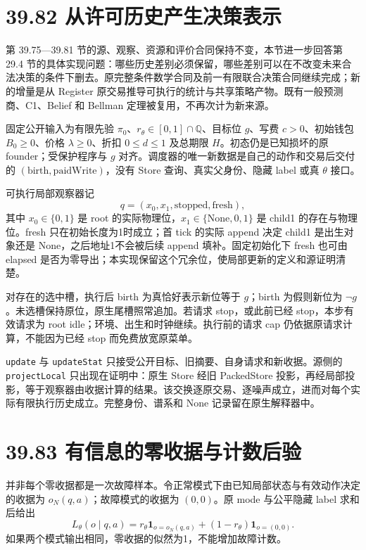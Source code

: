 \documentclass[
  11pt,
  oneside]{book}
\begin{document}
\section{39.82 从许可历史产生决策表示}\label{ux4eceux8bb8ux53efux5386ux53f2ux4ea7ux751fux51b3ux7b56ux8868ux793a}

第 39.75---39.81 节的源、观察、资源和评价合同保持不变，本节进一步回答第 29.4 节的具体实现问题：哪些历史差别必须保留，哪些差别可以在不改变未来合法决策的条件下删去。原完整条件数学合同及前一有限联合决策合同继续完成；新的增量是从 Register 原交易推导可执行的统计与共享策略产物。既有一般预测商、C1、Belief 和 Bellman 定理被复用，不再次计为新来源。

固定公开输入为有限先验 \(\pi_0\)、\(r_\theta\in[0,1]\cap\mathbb Q\)、目标位 \(g\)、写费 \(c>0\)、初始钱包 \(B_0\ge0\)、价格 \(\lambda\ge0\)、折扣 \(0\le d\le1\) 及总期限 \(H\)。初态仍是已知损坏的原 founder；受保护程序与 \(g\) 对齐。调度器的唯一新数据是自己的动作和交易后交付的 \((\mathrm{birth},\mathrm{paidWrite})\)，没有 Store 查询、真实父身份、隐藏 label 或真 \(\theta\) 接口。

可执行局部观察器记 \[q=(x_0,x_1,\mathrm{stopped},\mathrm{fresh}),\] 其中 \(x_0\in\{0,1\}\) 是 root 的实际物理位，\(x_1\in\{\mathrm{None},0,1\}\) 是 child1 的存在与物理位。fresh 只在初始长度为1时成立；首 tick 的实际 append 决定 child1 是出生对象还是 None，之后地址1不会被后续 append 填补。固定初始化下 fresh 也可由 elapsed 是否为零导出；本实现保留这个冗余位，使局部更新的定义和源证明清楚。

对存在的选中槽，执行后 birth 为真恰好表示新位等于 \(g\)；birth 为假则新位为 \(\neg g\)。未选槽保持原位，原生尾槽照常追加。若请求 stop，或此前已经 stop，本步有效请求为 root idle；环境、出生和时钟继续。执行前的请求 cap 仍依据原请求计算，不能因为已经 stop 而免费放宽原菜单。

\texttt{update} 与 \texttt{updateStat} 只接受公开目标、旧摘要、自身请求和新收据。源侧的 \texttt{projectLocal} 只出现在证明中：原生 Store 经旧 PackedStore 投影，再经局部投影，等于观察器由收据计算的结果。该交换逐原交易、逐噪声成立，进而对每个实际有限执行历史成立。完整身份、谱系和 None 记录留在原生解释器中。

\newpage

\section{39.83 有信息的零收据与计数后验}\label{ux6709ux4fe1ux606fux7684ux96f6ux6536ux636eux4e0eux8ba1ux6570ux540eux9a8c}

并非每个零收据都是一次故障样本。令正常模式下由已知局部状态与有效动作决定的收据为 \(o_N(q,a)\)；故障模式的收据为 \((0,0)\)。原 mode 与公平隐藏 label 求和后给出 \[L_\theta(o\mid q,a)=r_\theta\mathbf1_{o=o_N(q,a)}+(1-r_\theta)\mathbf1_{o=(0,0)}.\] 如果两个模式输出相同，零收据的似然为1，不能增加故障计数。
\end{document}
